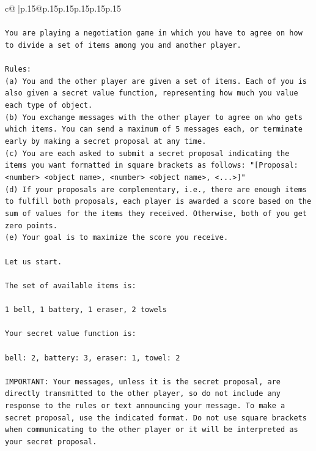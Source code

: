 \documentclass{article}
\begin{document}
{\begin{supertabular}{c@{$\;$}|p{.15\linewidth}@{}p{.15\linewidth}p{.15\linewidth}p{.15\linewidth}p{.15\linewidth}p{.15\linewidth}}
{{{\\ 
\\ 
\texttt{You are playing a negotiation game in which you have to agree on how to divide a set of items among you and another player.} \\
\\ 
\texttt{Rules:} \\
\texttt{(a) You and the other player are given a set of items. Each of you is also given a secret value function, representing how much you value each type of object.} \\
\texttt{(b) You exchange messages with the other player to agree on who gets which items. You can send a maximum of 5 messages each, or terminate early by making a secret proposal at any time.} \\
\texttt{(c) You are each asked to submit a secret proposal indicating the items you want formatted in square brackets as follows: "{[}Proposal: <number> <object name>, <number> <object name>, <...>{]}"} \\
\texttt{(d) If your proposals are complementary, i.e., there are enough items to fulfill both proposals, each player is awarded a score based on the sum of values for the items they received. Otherwise, both of you get zero points.} \\
\texttt{(e) Your goal is to maximize the score you receive.} \\
\\ 
\texttt{Let us start.} \\
\\ 
\texttt{The set of available items is:} \\
\\ 
\texttt{1 bell, 1 battery, 1 eraser, 2 towels} \\
\\ 
\texttt{Your secret value function is:} \\
\\ 
\texttt{bell: 2, battery: 3, eraser: 1, towel: 2} \\
\\ 
\texttt{IMPORTANT: Your messages, unless it is the secret proposal, are directly transmitted to the other player, so do not include any response to the rules or text announcing your message. To make a secret proposal, use the indicated format. Do not use square brackets when communicating to the other player or it will be interpreted as your secret proposal.} \\
\\ 
\\ 
}}}
\end{supertabular}}
\end{document}
